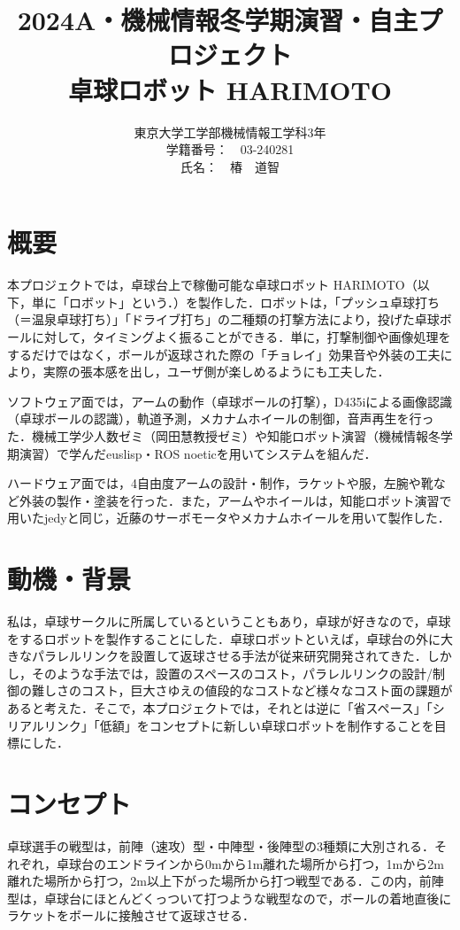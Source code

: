 \documentclass[11pt, oneside, titlepage]{jarticle}
\title{ \large{2024A・機械情報冬学期演習・自主プロジェクト}\\
\vspace{1cm}
\Huge{卓球ロボット HARIMOTO}}
\author{東京大学工学部機械情報工学科3年 \\
学籍番号：　03-240281 \\
氏名：　椿　道智}
\begin{document}
\maketitle
\section{概要}
本プロジェクトでは，卓球台上で稼働可能な卓球ロボット HARIMOTO（以下，単に「ロボット」という．）を製作した．ロボットは，「プッシュ卓球打ち（＝温泉卓球打ち）」「ドライブ打ち」の二種類の打撃方法により，投げた卓球ボールに対して，タイミングよく振ることができる．単に，打撃制御や画像処理をするだけではなく，ボールが返球された際の「チョレイ」効果音や外装の工夫により，実際の張本感を出し，ユーザ側が楽しめるようにも工夫した．

ソフトウェア面では，アームの動作（卓球ボールの打撃），D435iによる画像認識（卓球ボールの認識），軌道予測，メカナムホイールの制御，音声再生を行った．機械工学少人数ゼミ（岡田慧教授ゼミ）や知能ロボット演習（機械情報冬学期演習）で学んだeuslisp・ROS noeticを用いてシステムを組んだ．

ハードウェア面では，4自由度アームの設計・制作，ラケットや服，左腕や靴など外装の製作・塗装を行った．また，アームやホイールは，知能ロボット演習で用いたjedyと同じ，近藤のサーボモータやメカナムホイールを用いて製作した．

\section{動機・背景}
私は，卓球サークルに所属しているということもあり，卓球が好きなので，卓球をするロボットを製作することにした．卓球ロボットといえば，卓球台の外に大きなパラレルリンクを設置して返球させる手法が従来研究開発されてきた．しかし，そのような手法では，設置のスペースのコスト，パラレルリンクの設計/制御の難しさのコスト，巨大さゆえの値段的なコストなど様々なコスト面の課題があると考えた．そこで，本プロジェクトでは，それとは逆に「省スペース」「シリアルリンク」「低額」をコンセプトに新しい卓球ロボットを制作することを目標にした．

\section{コンセプト}
卓球選手の戦型は，前陣（速攻）型・中陣型・後陣型の3種類に大別される．それぞれ，卓球台のエンドラインから0mから1m離れた場所から打つ，1mから2m離れた場所から打つ，2m以上下がった場所から打つ戦型である．この内，前陣型は，卓球台にほとんどくっついて打つような戦型なので，ボールの着地直後にラケットをボールに接触させて返球させる．
\end{document}
